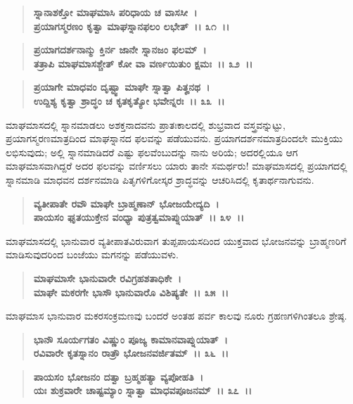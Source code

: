 \begin{verse}
\textbf{ಸ್ನಾನಾಶಕ್ತೋ ಮಾಘಮಾಸಿ ಪರಿಧಾಯ ಚ ವಾಸಸೀ~।}\\\textbf{ಪ್ರಯಾಗಸ್ಮರಣಂ ಕೃತ್ವಾ ಮಾಘಸ್ನಾನಫಲಂ ಲಭೇತ್~।। ೩೧~।। }
\end{verse}

\begin{verse}
\textbf{ಪ್ರಯಾಗದರ್ಶನಾನ್ಮು ಕ್ತಿರ್ನ ಜಾನೇ ಸ್ನಾನಜಂ ಫಲಮ್~।}\\\textbf{ತತ್ರಾಪಿ ಮಾಘಮಾಸಶ್ಚೇತ್ ಕೋ ವಾ ವರ್ಣಯಿತುಂ ಕ್ಷಮಃ~।। ೩೨~।। }
\end{verse}

\begin{verse}
\textbf{ಪ್ರಯಾಗೇ ಮಾಧವಂ ದೃಷ್ಟ್ವಾ ಮಾಘೇ ಸ್ನಾತ್ವಾ ಪಿತೄನಥ~।}\\\textbf{ಉದ್ದಿಶ್ಯ ಕೃತ್ವಾ ಶ್ರಾದ್ಧಂ ಚ ಕೃತಕೃತ್ಯೋ ಭವೇನ್ನರಃ~।। ೩೩~।।}
\end{verse}

ಮಾಘಮಾಸದಲ್ಲಿ ಸ್ನಾನಮಾಡಲು ಅಶಕ್ತನಾದವನು ಪ್ರಾತಃಕಾಲದಲ್ಲಿ ಶುಭ್ರವಾದ ವಸ್ತ್ರವನ್ನುಟ್ಟು, ಪ್ರಯಾಗಸ್ಮರಣಮಾತ್ರದಿಂದ ಮಾಘಸ್ನಾನದ ಫಲವನ್ನು ಪಡೆಯುವನು. ಪ್ರಯಾಗದರ್ಶನಮಾತ್ರದಿಂದಲೇ ಮುಕ್ತಿಯು ಲಭಿಸುವುದು; ಅಲ್ಲಿ ಸ್ನಾನಮಾಡಿದರೆ ಎಷ್ಟು ಫಲವೆಂಬುದನ್ನು ನಾನು ಅರಿಯೆ; ಅದರಲ್ಲಿಯೂ ಆಗ ಮಾಘಮಾಸವಾಗಿದ್ದರೆ ಅದರ ಫಲವನ್ನು ವರ್ಣಿಸಲು ಯಾರು ತಾನೇ ಸಮರ್ಥರು! ಮಾಘಮಾಸದಲ್ಲಿ ಪ್ರಯಾಗದಲ್ಲಿ ಸ್ನಾನಮಾಡಿ ಮಾಧವನ ದರ್ಶನಮಾಡಿ ಪಿತೃಗಳಿಗೋಸ್ಕರ ಶ್ರಾದ್ಧವನ್ನು ಆಚರಿಸಿದಲ್ಲಿ ಕೃತಾರ್ಥನಾಗುವನು.

\begin{verse}
\textbf{ವ್ಯತೀಪಾತೇ ರವೌ ಮಾಘೇ ಬ್ರಾಹ್ಮಣಾನ್ ಭೋಜಯೇದ್ಯದಿ~।}\\\textbf{ಪಾಯಸಂ ಘೃತಯುಕ್ತೇನ ವಂಧ್ಯಾ ಪುತ್ರತ್ವಮಾಪ್ನುಯಾತ್~।। ೩೪~।।}
\end{verse}

ಮಾಘಮಾಸದಲ್ಲಿ ಭಾನುವಾರ ವ್ಯತೀಪಾತವಿರುವಾಗ ತುಪ್ಪಪಾಯಸದಿಂದ ಯುಕ್ತವಾದ ಭೋಜನವನ್ನು ಬ್ರಾಹ್ಮಣರಿಗೆ ಮಾಡಿಸುವುದರಿಂದ ಬಂಜೆಯು ಮಗನನ್ನು ಪಡೆಯುವಳು.

\begin{verse}
\textbf{ಮಾಘಮಾಸೇ ಭಾನುವಾರೇ ರವಿಗ್ರಹಶತಾಧಿಕೇ~।}\\\textbf{ಮಾಘೇ ಮಕರಗೇ ಭಾಸೌ ಭಾನುವಾರೊ ವಿಶಿಷ್ಯತೇ~।। ೩೫~।।}
\end{verse}

ಮಾಘಮಾಸ ಭಾನುವಾರ ಮಕರಸಂಕ್ರಮಣವು ಬಂದರೆ ಅಂತಹ ಪರ್ವ ಕಾಲವು ನೂರು ಗ್ರಹಣಗಳಿಗಿಂತಲೂ ಶ್ರೇಷ್ಠ.

\begin{verse}
\textbf{ಭಾನೌ ಸೂರ್ಯಗತಂ ವಿಷ್ಣುಂ ಪೂಜ್ಯ ಕಾಮಾನವಾಪ್ನುಯಾತ್~।}\\\textbf{ರವಿವಾರೇ ಕೃತಸ್ನಾನಂ ರಾತ್ರೌ ಭೋಜನವರ್ಜಿತಮ್~।। ೩೬~।।} 
\end{verse}

\begin{verse}
\textbf{ಪಾಯಸಂ ಭೋಜನಂ ದತ್ವಾ ಬ್ರಹ್ಮಹತ್ಯಾ ವ್ಯಪೋಹತಿ~।}\\\textbf{ಯಃ ಶುಕ್ರವಾರೇ ಚಾಷ್ಟಮ್ಯಾಂ ಸ್ನಾತ್ವಾ ಮಾಧವಪೂಜನಮ್~।। ೩೭~।। }
\end{verse}


